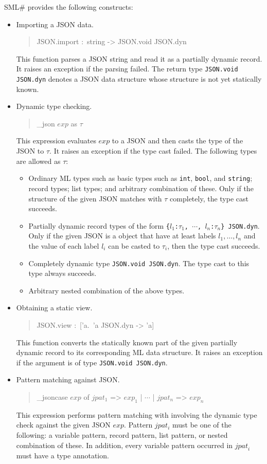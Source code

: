 \documentclass{jbook}
\newcommand{\smlsharp}{SML\#}
\newenvironment{program}{\begin{quote}\begin{tt}}%
                        {\end{tt}\end{quote}}
\begin{document}
\else%
	\smlsharp{} provides the following constructs:
\begin{itemize}
\item
	Importing a JSON data.
\begin{program}
JSON.import :\ string -> JSON.void JSON.dyn
\end{program}
	This function parses a JSON string and read it as a
partially dynamic record.
	It raises an exception if the parsing failed.
	The return type {\tt JSON.void JSON.dyn} denotes a JSON data
structure whose structure is not yet statically known.

\item
	Dynamic type checking.
\begin{program}
\_json $\mathit{exp}$ as $\tau$
\end{program}
	This expression evaluates $\mathit{exp}$ to a JSON
and then casts the type of the JSON to $\tau$.
	It raises an exception if the type cast failed.
        The following types are allowed as $\tau$:
\begin{itemize}
\item
	Ordinary ML types such as
basic types such as {\tt int}, {\tt bool}, and {\tt string};
record types;
list types; and
arbitrary combination of these.
	Only if the structure of the given JSON matches with $\tau$ completely,
the type cast succeeds.
\item
	Partially dynamic record types
of the form
{\tt \{$l_1$:$\tau_1$, $\cdots$, $l_n$:$\tau_n$\} JSON.dyn}.
	Only if the given JSON is a object
that have at least labels $l_1,\ldots,l_n$ and
the value of each label $l_i$ can be casted to $\tau_i$,
then the type cast succeeds.
\item
	Completely dynamic type
{\tt JSON.void JSON.dyn}.
	The type cast to this type always succeeds.
\item
	Arbitrary nested combination of the above types.
\end{itemize}

\item
        Obtaining a static view.
\begin{program}
JSON.view :\ ['a.\ 'a JSON.dyn -> 'a]
\end{program}
	This function converts
the statically known part of the given partially dynamic record
to its corresponding ML data structure.
	It raises an exception if
the argument is of type {\tt JSON.void JSON.dyn}.

\item
	Pattern matching against JSON.
\begin{program}
\_jsoncase $\mathit{exp}$ of
 $\mathit{jpat_1}$ => $\mathit{exp_1}$
 | $\cdots$ | $\mathit{jpat_n}$ => $\mathit{exp_n}$
\end{program}
	This expression performs pattern matching
with involving the dynamic type check against the given JSON $\mathit{exp}$.
	Pattern $\mathit{jpat_i}$ must be one of the following:
a variable pattern,
record pattern,
list pattern, or
nested combination of these.
	In addition, every variable pattern occurred
in $\mathit{jpat}_i$ must have a type annotation.


\end{itemize}
\end{document}
